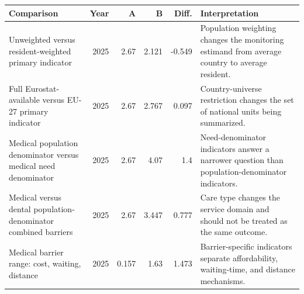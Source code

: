 \begingroup
\setlength{\tabcolsep}{4pt}
\renewcommand{\arraystretch}{1.14}
\begin{tabularx}{\textwidth}{@{}YrrrrY@{}}
\toprule
Comparison & Year & A & B & Diff. & Interpretation \\
\midrule
Unweighted versus resident-weighted primary indicator & 2025 & 2.67 & 2.121 & -0.549 & Population weighting changes the monitoring estimand from average country to average resident. \\
Full Eurostat-available versus EU-27 primary indicator & 2025 & 2.67 & 2.767 & 0.097 & Country-universe restriction changes the set of national units being summarized. \\
Medical population denominator versus medical need denominator & 2025 & 2.67 & 4.07 & 1.4 & Need-denominator indicators answer a narrower question than population-denominator indicators. \\
Medical versus dental population-denominator combined barriers & 2025 & 2.67 & 3.447 & 0.777 & Care type changes the service domain and should not be treated as the same outcome. \\
Medical barrier range: cost, waiting, distance & 2025 & 0.157 & 1.63 & 1.473 & Barrier-specific indicators separate affordability, waiting-time, and distance mechanisms. \\
\bottomrule
\end{tabularx}
\endgroup
